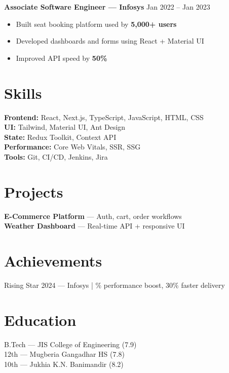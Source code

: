 \documentclass[a4paper,10pt]{article}
\begin{document}
\textbf{Associate Software Engineer — Infosys} \hfill {\small Jan 2022 -- Jan 2023}
\begin{itemize}
    \item Built seat booking platform used by \textbf{5,000+ users}
    \item Developed dashboards and forms using React + Material UI
    \item Improved API speed by \textbf{50\%}
\end{itemize}

\vspace{-6pt}

\section*{Skills}
\textbf{Frontend:} React, Next.js, TypeScript, JavaScript, HTML, CSS \\
\textbf{UI:} Tailwind, Material UI, Ant Design \\
\textbf{State:} Redux Toolkit, Context API \\
\textbf{Performance:} Core Web Vitals, SSR, SSG \\
\textbf{Tools:} Git, CI/CD, Jenkins, Jira

\vspace{-6pt}

\section*{Projects}
\textbf{E-Commerce Platform} — Auth, cart, order workflows \\
\textbf{Weather Dashboard} — Real-time API + responsive UI

\vspace{-6pt}

\section*{Achievements}
Rising Star 2024 — Infosys \quad | \% performance boost, 30\% faster delivery

\vspace{-6pt}

\section*{Education}
B.Tech — JIS College of Engineering (7.9) \\
12th — Mugberia Gangadhar HS (7.8) \\
10th — Jukhia K.N. Banimandir (8.2)
\end{document}
